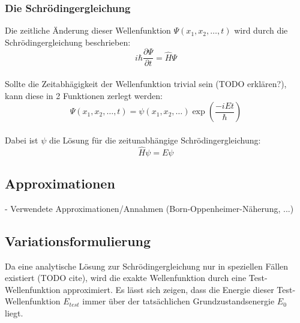 \documentclass[a4paper, 12pt]{report}
\begin{document}
\subsubsection{Die Schrödingergleichung}
Die zeitliche Änderung dieser Wellenfunktion $\Psi(x_1, x_2, \dots, t)$ 
wird durch die Schrödingergleichung beschrieben:
\begin{equation}
  i\hbar\frac{\partial\Psi}{\partial t} = \hat{H}\Psi
\end{equation}\\
Sollte die Zeitabhägigkeit der Wellenfunktion trivial sein (TODO erklären?),
kann diese in 2 Funktionen zerlegt werden:
\begin{equation*}
  \Psi(x_1, x_2, \dots, t) = \psi(x_1, x_2, \dots) \exp(\frac{-iEt}{\hbar})
\end{equation*}\\
Dabei ist $\psi$ die Lösung für die zeitunabhängige Schrödingergleichung:
\begin{equation}
  \hat{H}\psi = E\psi
\end{equation}
\cite[S. 24-25]{atkins_friedman_2011}

\subsection{Approximationen}
- Verwendete Approximationen/Annahmen (Born-Oppenheimer-Näherung, ...)

\subsection{Variationsformulierung}
Da eine analytische Lösung zur Schrödingergleichung nur in speziellen Fällen existiert (TODO cite),
wird die exakte Wellenfunktion durch eine Test-Wellenfunktion approximiert.
Es lässt sich zeigen, 
dass die Energie dieser Test-Wellenfunktion $E_{test}$ 
immer über der tatsächlichen Grundzustandsenergie $E_0$ liegt.
\end{document}
